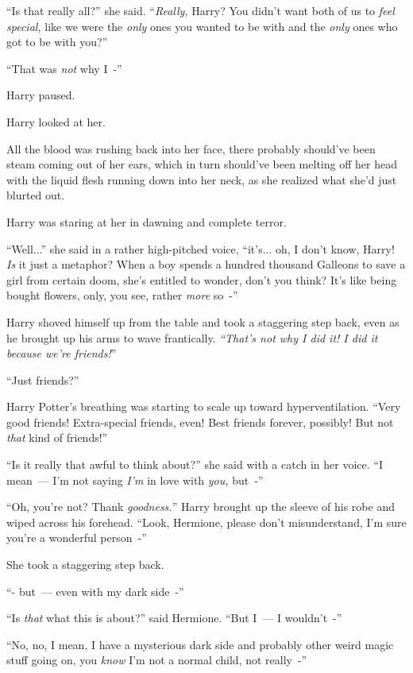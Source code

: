``Is that really all?'' she said. ``\emph{Really,} Harry? You didn't want both of us to \emph{feel special,} like we were the \emph{only} ones you wanted to be with and the \emph{only} ones who got to be with you?''

``That was \emph{not} why I~-''

Harry paused.

Harry looked at her.

All the blood was rushing back into her face, there probably should've been steam coming out of her ears, which in turn should've been melting off her head with the liquid flesh running down into her neck, as she realized what she'd just blurted out.

Harry was staring at her in dawning and complete terror.

``Well...'' she said in a rather high-pitched voice, ``it's... oh, I don't know, Harry! \emph{Is} it just a metaphor? When a boy spends a hundred thousand Galleons to save a girl from certain doom, she's entitled to wonder, don't you think? It's like being bought flowers, only, you see, rather \emph{more} so~-''

Harry shoved himself up from the table and took a staggering step back, even as he brought up his arms to wave frantically. \emph{``That's not why I did it! I did it because we're friends!}''

``Just friends?''

Harry Potter's breathing was starting to scale up toward hyperventilation. ``Very good friends! Extra-special friends, even! Best friends forever, possibly! But not \emph{that} kind of friends!''

``Is it really that awful to think about?'' she said with a catch in her voice. ``I mean~--- I'm not saying \emph{I'm} in love with \emph{you,} but~-''

``Oh, you're not? Thank \emph{goodness.}'' Harry brought up the sleeve of his robe and wiped across his forehead. ``Look, Hermione, please don't misunderstand, I'm sure you're a wonderful person~-''

She took a staggering step back.

``- but~--- even with my dark side~-''

``Is \emph{that} what this is about?'' said Hermione. ``But I~--- I wouldn't~-''

``No, no, I mean, I have a mysterious dark side and probably other weird magic stuff going on, you \emph{know} I'm not a normal child, not really~-''

